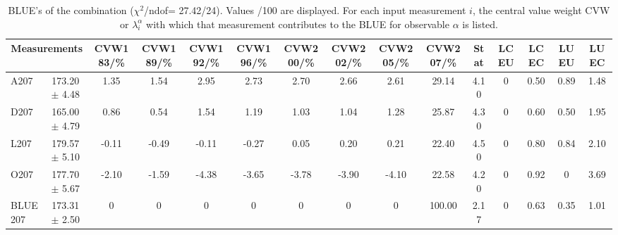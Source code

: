\begin{table}[H]
\scriptsize
\begin{center}
\renewcommand{\arraystretch}{1.1}
\begin{tabular}{|lc|c|c|c|c|c|c|c|c|ccccc|}
\hline
\multicolumn{2}{|c|}{Measurements} & CVW{\tiny 183}/\%  & CVW{\tiny 189}/\%  & CVW{\tiny 192}/\%  & CVW{\tiny 196}/\%  & CVW{\tiny 200}/\%  & CVW{\tiny 202}/\%  & CVW{\tiny 205}/\%  & CVW{\tiny 207}/\%  & {\tiny Stat} & {\tiny LCEU} & {\tiny LCEC} & {\tiny LUEU} & {\tiny LUEC}\\
\hline
A207 &     173.20 $\pm$       4.48 &       1.35 &       1.54 &       2.95 &       2.73 &       2.70 &       2.66 &       2.61 &      29.14 &       4.10 &  0 &       0.50 &       0.89 &       1.48\\
D207 &     165.00 $\pm$       4.79 &       0.86 &       0.54 &       1.54 &       1.19 &       1.03 &       1.04 &       1.28 &      25.87 &       4.30 &  0 &       0.60 &       0.50 &       1.95\\
L207 &     179.57 $\pm$       5.10 &      -0.11 &      -0.49 &      -0.11 &      -0.27 &       0.05 &       0.20 &       0.21 &      22.40 &       4.50 &  0 &       0.80 &       0.84 &       2.10\\
O207 &     177.70 $\pm$       5.67 &      -2.10 &      -1.59 &      -4.38 &      -3.65 &      -3.78 &      -3.90 &      -4.10 &      22.58 &       4.20 &  0 &       0.92 &  0 &       3.69\\
\hline
BLUE {\tiny 207} &     173.31 $\pm$       2.50 &  0 &  0 &  0 &  0 &  0 &  0 &  0 &     100.00 &       2.17 &  0 &       0.63 &       0.35 &       1.01\\
\hline
\end{tabular}
\caption{BLUE's of the combination ($\chi^2$/ndof=     27.42/24).
 Values /100 are displayed. For each input measurement $i$, the central value weight CVW or $\lambda_i^\alpha$ with which that measurement contributes to the BLUE for observable $\alpha$ is listed.}
\renewcommand{\arraystretch}{1}
\end{center}
\end{table}
